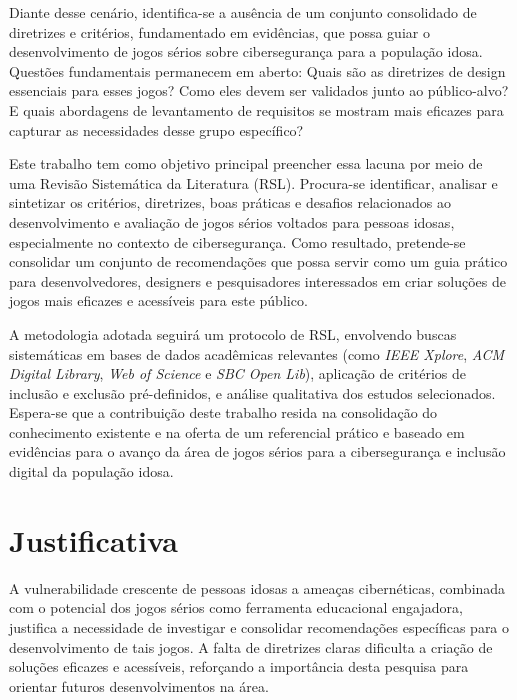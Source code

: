 Diante desse cenário, identifica-se a ausência de um conjunto consolidado de diretrizes e critérios, fundamentado em evidências, que possa guiar o desenvolvimento de jogos sérios sobre cibersegurança para a população idosa. Questões fundamentais permanecem em aberto: Quais são as diretrizes de design essenciais para esses jogos? Como eles devem ser validados junto ao público-alvo? E quais abordagens de levantamento de requisitos se mostram mais eficazes para capturar as necessidades desse grupo específico?

Este trabalho tem como objetivo principal preencher essa lacuna por meio de uma Revisão Sistemática da Literatura (RSL). Procura-se identificar, analisar e sintetizar os critérios, diretrizes, boas práticas e desafios relacionados ao desenvolvimento e avaliação de jogos sérios voltados para pessoas idosas, especialmente no contexto de cibersegurança. Como resultado, pretende-se consolidar um conjunto de recomendações que possa servir como um guia prático para desenvolvedores, designers e pesquisadores interessados em criar soluções de jogos mais eficazes e acessíveis para este público.

A metodologia adotada seguirá um protocolo de RSL, envolvendo buscas sistemáticas em bases de dados acadêmicas relevantes (como \textit{IEEE Xplore}, \textit{ACM Digital Library}, \textit{Web of Science} e \textit{SBC Open Lib}), aplicação de critérios de inclusão e exclusão pré-definidos, e análise qualitativa dos estudos selecionados. Espera-se que a contribuição deste trabalho resida na consolidação do conhecimento existente e na oferta de um referencial prático e baseado em evidências para o avanço da área de jogos sérios para a cibersegurança e inclusão digital da população idosa.

\section{Justificativa}
A vulnerabilidade crescente de pessoas idosas a ameaças cibernéticas, combinada com o potencial dos jogos sérios como ferramenta educacional engajadora, justifica a necessidade de investigar e consolidar recomendações específicas para o desenvolvimento de tais jogos. A falta de diretrizes claras dificulta a criação de soluções eficazes e acessíveis, reforçando a importância desta pesquisa para orientar futuros desenvolvimentos na área.

